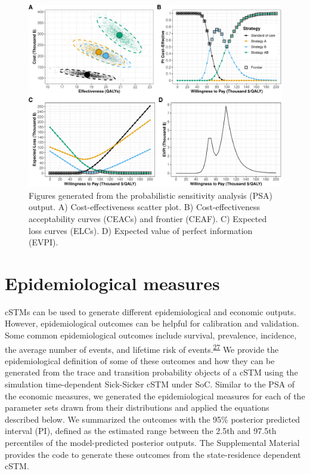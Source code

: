 \documentclass[
]{article}
\begin{document}
\begin{figure}[H]

{\centering \includegraphics{figs/PSA-figures-1} 

}

\caption{Figures generated from the probabilistic sensitivity analysis (PSA) output. A) Cost-effectiveness scatter plot. B) Cost-effectiveness acceptability curves (CEACs) and frontier (CEAF). C) Expected loss curves (ELCs). D) Expected value of perfect information (EVPI).}\label{fig:PSA-figures}
\end{figure}

\hypertarget{epidemiological-measures}{%
\section{Epidemiological measures}\label{epidemiological-measures}}

cSTMs can be used to generate different epidemiological and economic outputs. However, epidemiological outcomes can be helpful for calibration and validation. Some common epidemiological outcomes include survival, prevalence, incidence, the average number of events, and lifetime risk of events.\textsuperscript{\protect\hyperlink{ref-Siebert2012c}{27}} We provide the epidemiological definition of some of these outcomes and how they can be generated from the trace and transition probability objects of a cSTM using the simulation time-dependent Sick-Sicker cSTM under SoC. Similar to the PSA of the economic measures, we generated the epidemiological measures for each of the parameter sets drawn from their distributions and applied the equations described below. We summarized the outcomes with the 95\% posterior predicted interval (PI), defined as the estimated range between the 2.5th and 97.5th percentiles of the model-predicted posterior outputs. The Supplemental Material provides the code to generate these outcomes from the state-residence dependent cSTM.
\end{document}
